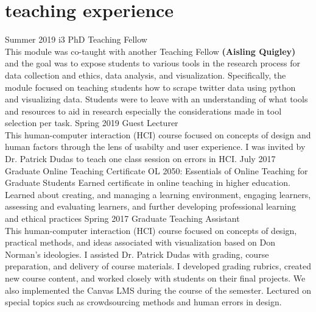 \documentclass[]{cv-style}          %
\begin{document}
\section{teaching experience}
\begin{entrylist}
\entry
{Summer 2019}
  {i3 PhD Teaching Fellow}
  {}
  {\\ 
  This module was co-taught with another Teaching Fellow \textbf{(Aisling Quigley)} and the goal was to expose students to various tools in the research process for data collection and ethics, data analysis, and visualization. Specifically, the module focused on teaching students how to scrape twitter data using python and visualizing data. Students were to leave with an understanding of what tools and resources to aid in research especially the considerations made in tool selection per task.  }
\entry
{Spring 2019}
  {Guest Lecturer}
  {}
  {\\ 
  This human-computer interaction (HCI) course focused on concepts of design and human factors through the lens of usabilty and user experience. I was invited by Dr. Patrick Dudas to teach one class session on errors in HCI.}
\entry
{July 2017}
{Graduate Online Teaching Certificate \newline
OL 2050: Essentials of Online Teaching for Graduate Students}
{}
{
Earned certificate in online teaching in higher education.
Learned about creating, and managing a learning environment,
engaging learners, assessing and evaluating learners, and further
developing professional learning and ethical practices}
\entry
  {Spring 2017}
  {Graduate Teaching Assistant}
  {}
  {\\ 
  This human-computer interaction (HCI) course focused on concepts of design, practical methods, and ideas associated with visualization based on Don Norman's ideologies. I assisted Dr. Patrick Dudas with grading, course preparation, and delivery of course materials. I developed grading rubrics, created new course content, and worked closely with students on their final projects. We also implemented the Canvas LMS during the course of the semester. Lectured on special topics such as crowdsourcing methods and human errors in design.
}
\end{entrylist}
\end{document}
